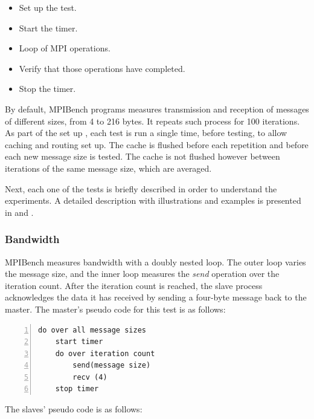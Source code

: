 \begin{itemize}
    \item Set up the test.
    \item Start the timer.
    \item Loop of MPI operations.
    \item Verify that those operations have completed.
    \item Stop the timer.
\end{itemize}

By default, MPIBench programs measures transmission and reception of messages 
of different sizes, from 4 to 216 bytes. It repeats such process for 100 
iterations. As part of the set up , each test is run a single time, before
testing, to allow caching and routing set up. The cache is flushed before each repetition
and before each new message size is tested. The cache is not flushed however
between iterations of the same message size, which are averaged.

Next, each one of the tests is briefly described in order to understand the
experiments. A detailed description with illustrations and examples is
presented in \cite{MPI-tutorial} and \cite{MPI-book}.

\subsubsection{Bandwidth}

MPIBench measures bandwidth with a doubly nested loop. The outer loop varies the
message size, and the inner loop measures the \textit{send} operation over the
iteration count. After the iteration count is reached, the slave process
acknowledges the data it has received by sending a four-byte message back to
the master. The master's pseudo code for this test is as follows:

\begin{minipage}{\textwidth}
\end{minipage}

\begin{minipage}{\linewidth}
\begin{lstlisting}[frame=single,numbers=left]
do over all message sizes 
    start timer
    do over iteration count 
        send(message size) 
        recv (4)
    stop timer
\end{lstlisting}
\end{minipage}

The slaves' pseudo code is as follows:

\begin{minipage}{\textwidth}
\end{minipage}

